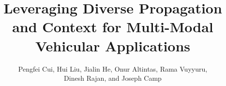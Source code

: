 \documentclass[10pt,conference]{IEEEtran}
\begin{document}
\title{Leveraging Diverse Propagation and Context for Multi-Modal Vehicular Applications}
\author{Pengfei Cui, Hui Liu, Jialin He, Onur Altintas, Rama Vuyyuru, \\
Dinesh Rajan, and Joseph Camp\\ 
}





\maketitle






%












\end{document}
